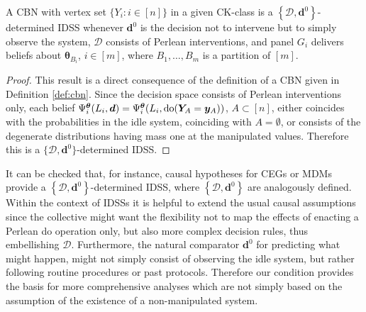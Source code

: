 \begin{lemma}
\label{lemma:det}
A CBN with vertex set $\{Y_i:i\in[n]\}$ in a given CK-class is a $\left\{ \bm{\mathcal{D}},\bm{d}^{0}\right\}$-determined IDSS whenever $\bm{d}^{0}$ is the decision not to intervene but to simply observe the system, $\bm{\mathcal{D}}$ consists of Perlean interventions, and panel $G_i$ delivers beliefs about $\bm{\theta}_{B_i}$, $i\in[m]$, where $B_1,\dots,B_m$ is a partition of $[m]$.
\end{lemma}

\begin{proof}
This result is a direct consequence of the definition of a CBN given in Definition \ref{def:cbn}. Since the decision space consists of Perlean interventions only, each belief $\Psi_i^{\bm{\theta}}(L_i,\bm{d})=\Psi_i^{\bm{\theta}}(L_i,\textnormal{do}(\bm{Y}_A=\bm{y}_A))$, $A\subset [n]$, either coincides with the probabilities in the idle system, coinciding with $A=\emptyset$, or consists of the degenerate distributions having mass one at the manipulated values. Therefore this is a $\{\bm{\mathcal{D}},\bm{d}^0\}$-determined IDSS.
\end{proof}

It can be  checked that, for instance, causal hypotheses for CEGs or MDMs provide a $\left\{ \bm{\mathcal{D}},\bm{d}^{0}\right\}$-determined IDSS, where $\left\{\bm{\mathcal{D}},\bm{d}^{0}\right\} $ are analogously defined.
Within the context of IDSSs it is helpful to extend the usual causal assumptions since the collective might want the flexibility not to map the effects of enacting a  Perlean do operation only, but also more complex decision rules, thus embellishing $\bm{\mathcal{D}}$. Furthermore, the natural comparator $\bm{d}^{0}$ for predicting what might happen, might not simply  consist of observing  the idle system, but rather following routine procedures or past protocols. Therefore our condition provides the basis for more comprehensive analyses which are not simply based on the assumption of the existence of a non-manipulated system.

